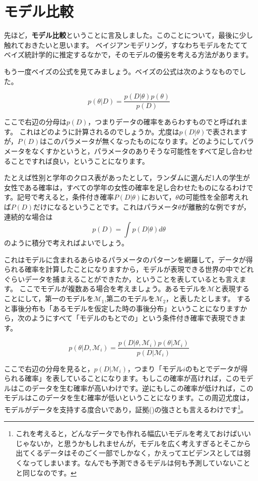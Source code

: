\documentclass{ltjsbook}
\begin{document}
\section{モデル比較}
先ほど，\textbf{モデル比較}ということに言及しました。このことについて，最後に少し触れておきたいと思います。
ベイジアンモデリング，すなわちモデルをたててベイズ統計学的に推定するなかで，そのモデルの優劣を考える方法があります。

もう一度ベイズの公式を見てみましょう。ベイズの公式は次のようなものでした。

\[ p(\theta| D) = \frac{p(D| \theta)p(\theta)}{p(D)} \]

ここで右辺の分母は$p(D)$，つまりデータの確率をあらわすものでと呼ばれます。
これはどのように計算されるのでしょうか。尤度は$p(D| \theta)$で表されますが，$P(D)$はこのパラメータが無くなったものになります。どのようにしてパラメータをなくすかというと，パラメータのありそうな可能性をすべて足し合わせることですれば良い，ということになります。

たとえば性別と学年のクロス表があったとして，ランダムに選んだ1人の学生が女性である確率は，すべての学年の女性の確率を足し合わせたものになるわけです。記号で考えると，条件付き確率$P(D| \theta)$において，$\theta$の可能性を全部考えれば$P(D)$だけになるということです。これはパラメータ$\theta$が離散的な例ですが，連続的な場合は
$$ p(D) = \int p(D | \theta ) d\theta $$
のように積分で考えればよいでしょう。

これはモデルに含まれるあらゆるパラメータのパターンを網羅して，データが得られる確率を計算したことになりますから，モデルが表現できる世界の中でどれぐらいデータを捕まえることができたか，ということを表しているとも言えます。
ここでモデルが複数ある場合を考えましょう。あるモデルを$\mathcal{M}$と表現することにして，第一のモデルを$\mathcal{M}_1$,第二のモデルを$\mathcal{M}_2$，と表したとします。
すると事後分布も「あるモデルを仮定した時の事後分布」ということになりますから，次のようにすべて「モデルのもとでの」という条件付き確率で表現できます。

$$ p(\theta | D,\mathcal{M}_i) = \frac{p(D | \theta,\mathcal{M}_i)p(\theta | \mathcal{M}_i)}{p(D| \mathcal{M}_i)} $$

ここで右辺の分母を見ると，$p(D| \mathcal{M}_i)$，つまり「モデル$i$のもとでデータが得られる確率」を表していることになります。もしこの確率が高ければ，このモデルはこのデータを生む確率が高いわけです。逆にもしこの確率が低ければ，このモデルはこのデータを生む確率が低いということになります。この周辺尤度は，モデルがデータを支持する度合いであり，証拠()の強さとも言えるわけです\footnote{これを考えると，どんなデータでも作れる幅広いモデルを考えておけばいいじゃないか，と思うかもしれませんが，モデルを広く考えすぎるとそこから出てくるデータはそのごく一部でしかなく，かえってエビデンスとしては弱くなってしまいます。なんでも予測できるモデルは何も予測していないことと同じなのです。}。
\end{document}
